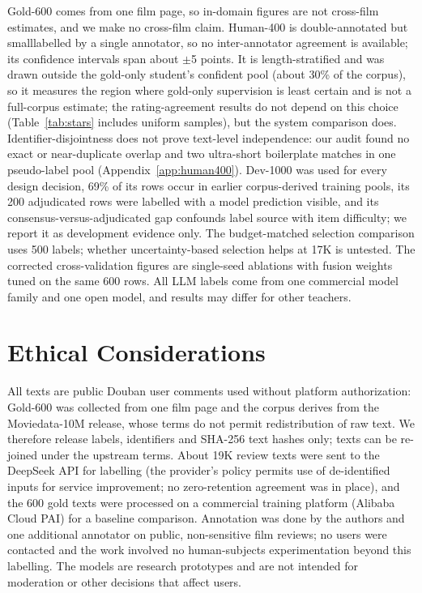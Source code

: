 \documentclass[11pt]{article}
\begin{document}
Gold-600 comes from one film page, so in-domain figures are not
cross-film estimates, and we make no cross-film claim. Human-400 is
\ifSfive double-annotated but small\else labelled by a single
annotator, so no inter-annotator agreement is available\fi; its
confidence intervals span about $\pm$5 points. It is length-stratified
and was drawn outside the gold-only student's confident pool (about
30\% of the corpus), so it measures the region where gold-only
supervision is least certain and is not a full-corpus estimate; the
rating-agreement results do not depend on this choice
(Table~\ref{tab:stars} includes uniform samples), but the system
comparison does. Identifier-disjointness does not prove text-level
independence: our audit found no exact or near-duplicate overlap and
two ultra-short boilerplate matches in one pseudo-label pool
(Appendix~\ref{app:human400}). Dev-1000 was used for every design
decision, 69\% of its rows occur in earlier corpus-derived training
pools, its 200 adjudicated rows were labelled with a model prediction
visible, and its consensus-versus-adjudicated gap confounds label
source with item difficulty; we report it as development evidence
only. The budget-matched selection comparison uses 500 labels;
whether uncertainty-based selection helps at 17K is untested. The
corrected cross-validation figures are single-seed ablations with
fusion weights tuned on the same 600 rows. All LLM labels come from
one commercial model family and one open model, and results may differ
for other teachers.

\section*{Ethical Considerations}
\label{sec:ethics}

All texts are public Douban user comments used without platform
authorization: Gold-600 was collected from one film page and the
corpus derives from the Moviedata-10M release, whose terms do not
permit redistribution of raw text. We therefore release labels,
identifiers and SHA-256 text hashes only; texts can be re-joined
under the upstream terms. About 19K review texts were sent to the
DeepSeek API for labelling (the provider's policy permits use of
de-identified inputs for service improvement; no zero-retention
agreement was in place), and the 600 gold texts were processed on a
commercial training platform (Alibaba Cloud PAI) for a baseline
comparison. Annotation was
done by the authors and one additional annotator on public,
non-sensitive film reviews; no users were contacted and the work
involved no human-subjects experimentation beyond this labelling. The
models are research prototypes and are not intended for moderation or
other decisions that affect users.




\end{document}
